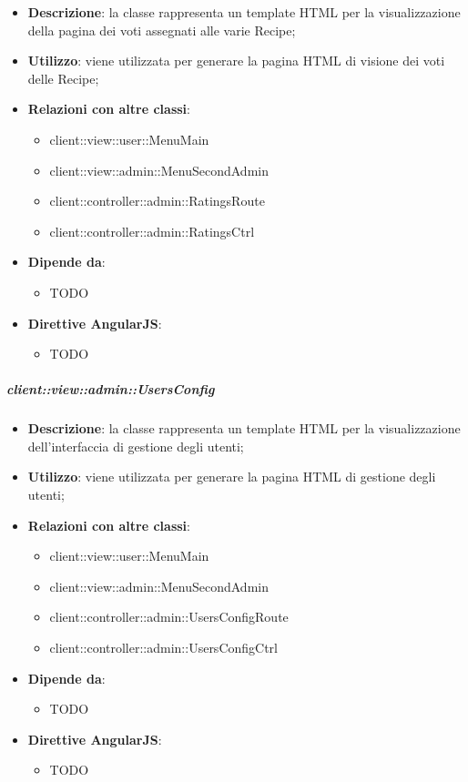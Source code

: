 			\begin{itemize}
				\item \textbf{Descrizione}: la classe rappresenta un template HTML per la visualizzazione della pagina dei voti assegnati alle varie Recipe;
				\item \textbf{Utilizzo}: viene utilizzata per generare la pagina HTML di visione dei voti delle Recipe;
				\item \textbf{Relazioni con altre classi}:
					\begin{itemize}
						\item client::view::user::MenuMain
						\item client::view::admin::MenuSecondAdmin
						\item client::controller::admin::RatingsRoute
						\item client::controller::admin::RatingsCtrl
					\end{itemize}
				\item \textbf{Dipende da}:
					\begin{itemize}
						\item TODO
					\end{itemize}
				\item \textbf{Direttive AngularJS}:
					\begin{itemize}
						\item TODO
					\end{itemize}
			\end{itemize}

		\subparagraph{client::view::admin::UsersConfig} %
		\label{subp:bdsm_app_client_view_admin_usersconfig}

			\begin{itemize}
				\item \textbf{Descrizione}: la classe rappresenta un template HTML per la visualizzazione dell'interfaccia di gestione degli utenti;
				\item \textbf{Utilizzo}: viene utilizzata per generare la pagina HTML di gestione degli utenti;
				\item \textbf{Relazioni con altre classi}:
					\begin{itemize}
						\item client::view::user::MenuMain
						\item client::view::admin::MenuSecondAdmin
						\item client::controller::admin::UsersConfigRoute
						\item client::controller::admin::UsersConfigCtrl
					\end{itemize}
				\item \textbf{Dipende da}:
					\begin{itemize}
						\item TODO
					\end{itemize}
				\item \textbf{Direttive AngularJS}:
					\begin{itemize}
						\item TODO
					\end{itemize}
			\end{itemize}

